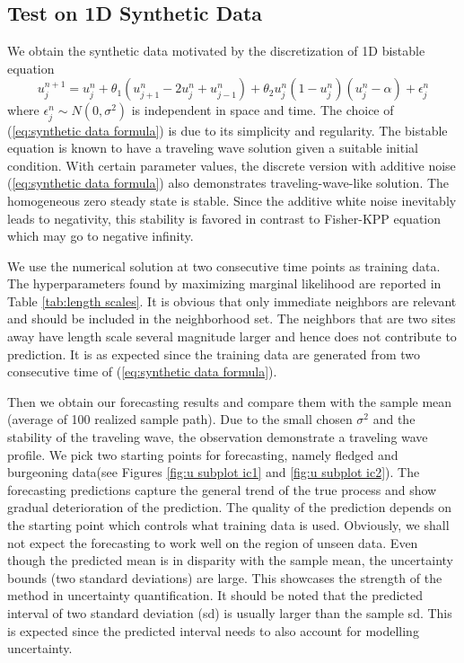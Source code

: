 \documentclass[smallextended,natbib]{svjour3}       %
\begin{document}
\subsection{Test on 1D Synthetic Data}
\label{sec:GP1d}
We obtain the synthetic data motivated by the discretization of 1D bistable equation
\begin{equation}
u_{j}^{n+1}=u_{j}^{n}+\theta_{1}(u_{j+1}^{n}-2u_{j}^{n}+u_{j-1}^{n})+\theta_{2}u_{j}^{n}(1-u_{j}^{n})(u_{j}^{n}-\alpha)+\epsilon_{j}^{n}\label{eq:synthetic data formula}
\end{equation}
where $\epsilon_{j}^{n}\sim N(0,\sigma^{2})$ is independent in space and time. The choice of (\ref{eq:synthetic data formula}) is due to its simplicity and regularity. The bistable equation is known to have a traveling wave solution given a suitable initial condition. With certain parameter values, the discrete version with additive noise (\ref{eq:synthetic data formula}) also demonstrates traveling-wave-like solution. The homogeneous zero steady state is stable. Since the additive white noise inevitably leads to negativity, this stability is favored in contrast to Fisher-KPP equation which may go to negative infinity.          

We use the numerical solution at two consecutive time points as training data. The hyperparameters found by maximizing marginal likelihood are reported in Table \ref{tab:length scales}. It is obvious that only immediate neighbors are relevant and should be included in the neighborhood set. The neighbors that are two sites away have length scale several magnitude larger and hence does not contribute to prediction. It is as expected since the training data are generated from two consecutive time of (\ref{eq:synthetic data formula}).     

Then we obtain our forecasting results and compare them with the sample mean (average of 100 realized sample path). Due to the small chosen $\sigma^2$ and the stability of the traveling wave, the observation demonstrate a traveling wave profile.  We pick two starting points for forecasting, namely fledged and burgeoning data(see Figures \ref{fig:u subplot ic1} and \ref{fig:u subplot ic2}). The forecasting predictions capture the general trend of the true process and show gradual deterioration of the prediction. The quality of the prediction depends on the starting point which controls what training data is used. Obviously, we shall not expect the forecasting to work well on the region of unseen data. Even though the predicted mean is in disparity with the sample mean, the uncertainty bounds (two standard deviations) are large. This showcases the strength of the method in uncertainty quantification. It should be noted that the predicted interval of two standard deviation (sd) is usually larger than the sample sd. This is expected since the predicted interval needs to also account for modelling uncertainty.  
\end{document}
